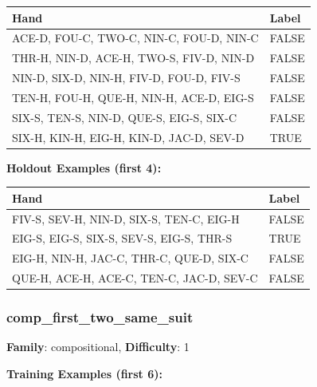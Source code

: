 \documentclass[10pt,a4paper]{article}
\begin{document}
\begin{small}
\begin{tabular}{p{8cm}l}
\toprule
Hand & Label \\
\midrule
ACE-D, FOU-C, TWO-C, NIN-C, FOU-D, NIN-C & \textcolor{negative}{FALSE} \\
THR-H, NIN-D, ACE-H, TWO-S, FIV-D, NIN-D & \textcolor{negative}{FALSE} \\
NIN-D, SIX-D, NIN-H, FIV-D, FOU-D, FIV-S & \textcolor{negative}{FALSE} \\
TEN-H, FOU-H, QUE-H, NIN-H, ACE-D, EIG-S & \textcolor{negative}{FALSE} \\
SIX-S, TEN-S, NIN-D, QUE-S, EIG-S, SIX-C & \textcolor{negative}{FALSE} \\
SIX-H, KIN-H, EIG-H, KIN-D, JAC-D, SEV-D & \textcolor{positive}{TRUE} \\
\bottomrule
\end{tabular}
\end{small}

\textbf{Holdout Examples (first 4):}

\begin{small}
\begin{tabular}{p{8cm}l}
\toprule
Hand & Label \\
\midrule
FIV-S, SEV-H, NIN-D, SIX-S, TEN-C, EIG-H & \textcolor{negative}{FALSE} \\
EIG-S, EIG-S, SIX-S, SEV-S, EIG-S, THR-S & \textcolor{positive}{TRUE} \\
EIG-H, NIN-H, JAC-C, THR-C, QUE-D, SIX-C & \textcolor{negative}{FALSE} \\
QUE-H, ACE-H, ACE-C, TEN-C, JAC-D, SEV-C & \textcolor{negative}{FALSE} \\
\bottomrule
\end{tabular}
\end{small}

\vspace{0.5cm}

\subsubsection{comp\_first\_two\_same\_suit}

\textbf{Family}: compositional, \textbf{Difficulty}: 1

\textbf{Training Examples (first 6):}
\end{document}
